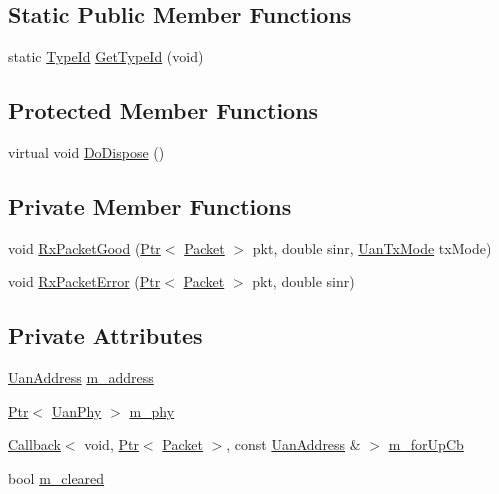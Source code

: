 \subsection*{Static Public Member Functions}
\begin{DoxyCompactItemize}
\item 
static \hyperlink{classns3_1_1TypeId}{Type\+Id} \hyperlink{classns3_1_1UanMacAloha_aeb681cc04a255ad192439de27968f709}{Get\+Type\+Id} (void)
\end{DoxyCompactItemize}
\subsection*{Protected Member Functions}
\begin{DoxyCompactItemize}
\item 
virtual void \hyperlink{classns3_1_1UanMacAloha_ad147c4df8b29a773eb6219004bca4e7f}{Do\+Dispose} ()
\end{DoxyCompactItemize}
\subsection*{Private Member Functions}
\begin{DoxyCompactItemize}
\item 
void \hyperlink{classns3_1_1UanMacAloha_ad0525b3ca9dc5d6db32b1ed95aee5f1b}{Rx\+Packet\+Good} (\hyperlink{classns3_1_1Ptr}{Ptr}$<$ \hyperlink{classns3_1_1Packet}{Packet} $>$ pkt, double sinr, \hyperlink{classns3_1_1UanTxMode}{Uan\+Tx\+Mode} tx\+Mode)
\item 
void \hyperlink{classns3_1_1UanMacAloha_af1938ba4949093dc2b852cc494d5d958}{Rx\+Packet\+Error} (\hyperlink{classns3_1_1Ptr}{Ptr}$<$ \hyperlink{classns3_1_1Packet}{Packet} $>$ pkt, double sinr)
\end{DoxyCompactItemize}
\subsection*{Private Attributes}
\begin{DoxyCompactItemize}
\item 
\hyperlink{classns3_1_1UanAddress}{Uan\+Address} \hyperlink{classns3_1_1UanMacAloha_abebe096f888c8c7d758f918680a4281b}{m\+\_\+address}
\item 
\hyperlink{classns3_1_1Ptr}{Ptr}$<$ \hyperlink{classns3_1_1UanPhy}{Uan\+Phy} $>$ \hyperlink{classns3_1_1UanMacAloha_a28a92b970612d357a2b8309e5b8d5fe5}{m\+\_\+phy}
\item 
\hyperlink{classns3_1_1Callback}{Callback}$<$ void, \hyperlink{classns3_1_1Ptr}{Ptr}$<$ \hyperlink{classns3_1_1Packet}{Packet} $>$, const \hyperlink{classns3_1_1UanAddress}{Uan\+Address} \& $>$ \hyperlink{classns3_1_1UanMacAloha_a7ffb8c0a17eb6cabf3ec8ca890e5f02c}{m\+\_\+for\+Up\+Cb}
\item 
bool \hyperlink{classns3_1_1UanMacAloha_a4ded12134d8b3461ddac233d9eea4dc0}{m\+\_\+cleared}
\end{DoxyCompactItemize}
